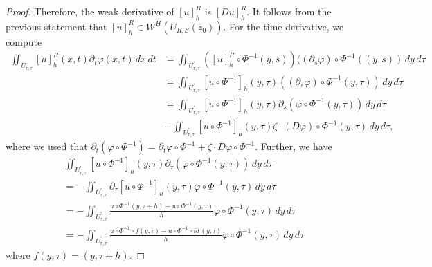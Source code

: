 \documentclass[notitlepage,11pt,reqno]{amsart}
\theoremstyle{definition}
\numberwithin{equation}{section}
\begin{document}
\begin{proof}
Therefore, the weak derivative of $[u]_{h}^{R}$ is $[Du]_{h}^{R}$.
It follows from the previous statement that $[u]_{h}^{R}\in W^{H}(U_{R, S}(z_0))$. For the
time derivative, we compute
\begin{align*}
\iint_{U_{r, \tau}}[u]_{h}^{R}(x,t)\partial_{t}\varphi(x, t) \,dx \,dt & =\iint_{U^{\prime}_{r, \tau}}([u]_{h}^{R}\circ\Phi^{-1}(y,s))((\partial_{s}\varphi)\circ\Phi^{-1}((y,s))\,dy \, d\tau\\
 & =\iint_{U^{\prime}_{r, \tau}}[u\circ\Phi^{-1}]_{h}(y, \tau)((\partial_{s}\varphi)\circ\Phi^{-1}(y, \tau))\,dy\, d\tau\\
 & =\iint_{U^{\prime}_{r, \tau}}[u\circ\Phi^{-1}]_{h}(y, \tau)\partial_{s}(\varphi\circ\Phi^{-1}(y, \tau))\,dy\, d\tau\\
 &-\iint_{U^{\prime}_{r, \tau}}[u\circ\Phi^{-1}]_{h}(y, \tau)\zeta\cdot(D\varphi)\circ\Phi^{-1}(y, \tau)\,dy\, d\tau,
\end{align*}
where we used that $\partial_{t}(\varphi\circ\Phi^{-1})=\partial_{t}\varphi\circ\Phi^{-1}+\zeta\cdot D\varphi\circ\Phi^{-1}$.
Further, we have
\begin{align*}
&\iint_{U^{\prime}_{r, \tau}}[u\circ\Phi^{-1}]_{h}(y, \tau)\partial_{\tau}(\varphi\circ\Phi^{-1}(y, \tau))\,dy\, d\tau\\
& =-\iint_{U^{\prime}_{r, \tau}}\partial_{\tau}[u\circ\Phi^{-1}]_{h}(y, \tau)\varphi\circ\Phi^{-1}(y, \tau)\,dy\, d\tau\\
 & =-\iint_{U^{\prime}_{r, \tau}}\frac{u\circ\Phi^{-1}(y,\tau+h)-u\circ\Phi^{-1}(y,\tau)}{h}\varphi\circ\Phi^{-1}(y,\tau)\,dy\,d\tau\\
& =-\iint_{U^{\prime}_{r, \tau}}\frac{u\circ\Phi^{-1}\circ f(y,\tau)-u\circ\Phi^{-1} \circ id \,(y,\tau)}{h}\varphi\circ\Phi^{-1}(y,\tau)\,dy\,d\tau
\end{align*}
where $f(y, \tau)=(y, \tau+h).$


\end{proof}
\end{document}
